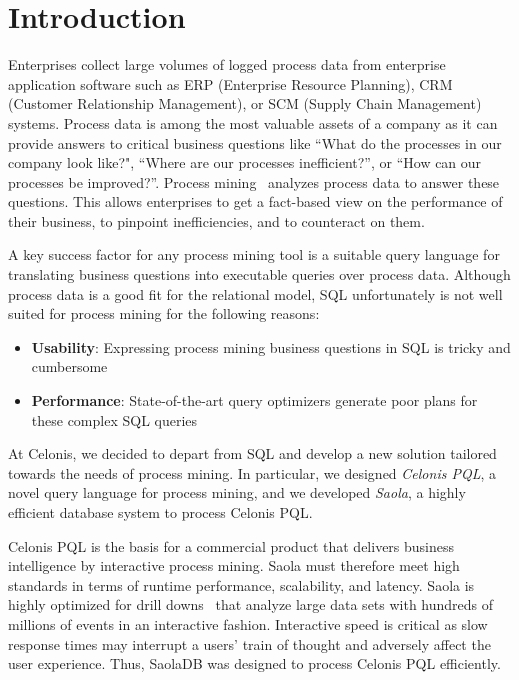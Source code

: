 \section{Introduction}
\label{sec:introduction} 

Enterprises collect large volumes of logged process data from enterprise application software
such as ERP (Enterprise Resource Planning), CRM (Customer Relationship Management),
or SCM (Supply Chain Management) systems. Process data is among the most
valuable assets of a company as it can provide answers to critical business
questions like ``What do the processes in our company look like?", ``Where are
our processes inefficient?'', or ``How can our processes be improved?''. Process
mining~\cite{process-mining} analyzes process data to answer these questions.
This allows enterprises to get a fact-based view on the performance of their
business, to pinpoint inefficiencies, and to counteract on them.

A key success factor for any process mining tool is a suitable query
language for translating business questions into executable queries over process data. 
Although process data is a good fit for the relational model, SQL unfortunately is not well suited for process mining for the following reasons:

\begin{itemize}
\item \textbf{Usability}: Expressing process mining business questions in SQL is tricky and cumbersome
\item \textbf{Performance}: State-of-the-art query optimizers generate poor plans for these complex SQL queries
\end{itemize}

At Celonis, we decided to depart from SQL and develop a new solution tailored
towards the needs of process mining. In particular, we designed \emph{Celonis PQL}, a novel query language for process mining, and we developed \emph{Saola}, a highly efficient database system to process Celonis PQL. 

Celonis PQL is the basis for a commercial product that delivers business
intelligence by interactive process mining. Saola must therefore meet high 
standards in terms of runtime performance, scalability, and latency. 
Saola is highly optimized for drill downs~\cite{drill-down} that
analyze large data sets with hundreds of millions of events in an interactive
fashion. Interactive speed is critical as slow response times
may interrupt a users' train of thought and adversely affect the user
experience. Thus, SaolaDB was designed to process Celonis PQL efficiently.

